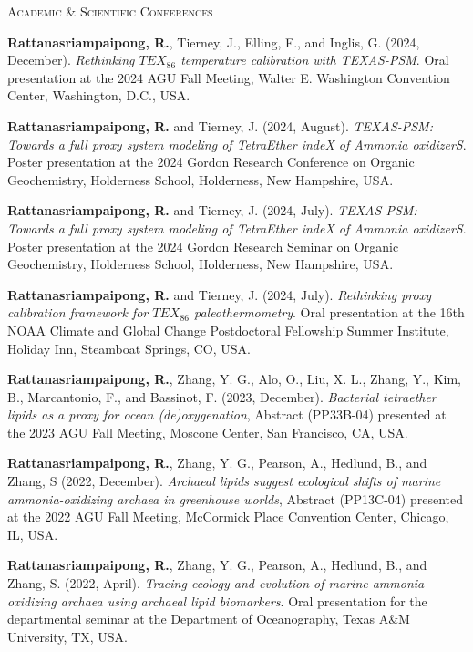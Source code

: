 \documentclass[10pt, letter]{article}
\newcommand{\myname}[1]{\textbf{Rattanasriampaipong, R.}}
\newcommand{\margintext}[1]{\marginnote{\normalsize\textbf #1 |}}
\begin{document}
\bigskip
\margintext{Presentations} 
\textsc{Academic \& Scientific Conferences}
\begin{etaremune}
\item {\myname{rattanasriampaipong}}, Tierney, J., Elling, F., and Inglis, G. (2024, December). \textit{Rethinking $TEX_{86}$ temperature calibration with TEXAS-PSM}. Oral presentation at the 2024 AGU Fall Meeting, Walter E. Washington Convention Center, Washington, D.C., USA.

\item {\myname{rattanasriampaipong}} and Tierney, J. (2024, August). \textit{TEXAS-PSM: Towards a full proxy system modeling of TetraEther indeX of Ammonia oxidizerS}. Poster presentation at the 2024 Gordon Research Conference on Organic Geochemistry, Holderness School, Holderness, New Hampshire, USA.

\item {\myname{rattanasriampaipong}} and Tierney, J. (2024, July). \textit{TEXAS-PSM: Towards a full proxy system modeling of TetraEther indeX of Ammonia oxidizerS}. Poster presentation at the 2024 Gordon Research Seminar on Organic Geochemistry, Holderness School, Holderness, New Hampshire, USA.

\item {\myname{rattanasriampaipong}} and Tierney, J. (2024, July). \textit{Rethinking proxy calibration framework for $TEX_{86}$ paleothermometry}. Oral presentation at the 16th NOAA Climate and Global Change Postdoctoral Fellowship Summer Institute, Holiday Inn, Steamboat Springs, CO, USA.

\item {\myname{rattanasriampaipong}}, Zhang, Y. G., Alo, O., Liu, X. L., Zhang, Y., Kim, B., Marcantonio, F., and Bassinot, F. (2023, December). \textit{Bacterial tetraether lipids as a proxy for ocean (de)oxygenation}, Abstract (PP33B-04) presented at the 2023 AGU Fall Meeting, Moscone Center, San Francisco, CA, USA.

\item {\myname{rattanasriampaipong}}, Zhang, Y. G., Pearson, A., Hedlund, B., and Zhang, S (2022, December). \textit{Archaeal lipids suggest ecological shifts of marine ammonia-oxidizing archaea in greenhouse worlds}, Abstract (PP13C-04) presented at the 2022 AGU Fall Meeting, McCormick Place Convention Center, Chicago, IL, USA.

\item {\myname{rattanasriampaipong}}, Zhang, Y. G., Pearson, A., Hedlund, B., and Zhang, S. (2022, April). \textit{Tracing ecology and evolution of marine ammonia-oxidizing archaea using archaeal lipid biomarkers}. Oral presentation for the departmental seminar at the Department of Oceanography, Texas A\&M University, TX, USA.


\end{etaremune}
\end{document}
